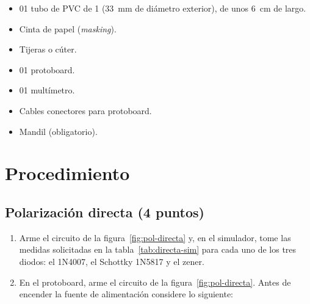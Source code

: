 \documentclass[11pt,a4paper]{article}
\newcommand{\puntos}[1]{\normalfont\normalsize\textmd{(#1 puntos)}}
\begin{document}
\begin{itemize}
          (\qty{0.51}{\milli\metre} de diámetro).
    \item 01 tubo de PVC de 1\textquotedbl{} (\qty{33}{\milli\metre} de diámetro
          exterior), de unos \qty{6}{\centi\metre} de largo.
    \item Cinta de papel (\emph{masking}).
    \item Tijeras o cúter.
    \item 01 protoboard.
    \item 01 multímetro.
    \item Cables conectores para protoboard.
    \item Mandil (obligatorio).
\end{itemize}

\FloatBarrier
\section{Procedimiento}
\subsection{Polarización directa \puntos{4}}
\label{sec:directa}

\begin{enumerate}[label=\textbf{\alph*)}, leftmargin=*, labelsep=0.6em]
\item Arme el circuito de la figura~\ref{fig:pol-directa} y, en el simulador, tome las
medidas solicitadas en la tabla~\ref{tab:directa-sim} para cada uno de los tres
diodos: el 1N4007, el Schottky 1N5817 y el zener.

\item En el protoboard, arme el circuito de la figura~\ref{fig:pol-directa}. Antes de encender la
fuente de alimentación considere lo siguiente:
\end{enumerate}
\end{document}
